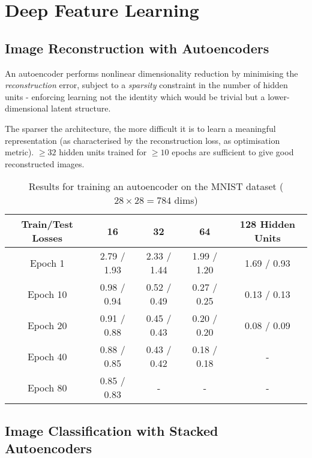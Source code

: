 \section{Deep Feature Learning}

\subsection{Image Reconstruction with Autoencoders}

An autoencoder performs nonlinear dimensionality reduction
by minimising the \textit{reconstruction} error,
subject to a \textit{sparsity} constraint in the number of hidden units -
enforcing learning not the identity which would be trivial but a lower-dimensional latent structure.

The sparser the architecture, the more difficult it is to learn a meaningful representation
(as characterised by the reconstruction loss, as optimisation metric).
$\geq 32$ hidden units trained for $\geq 10$ epochs are sufficient to give good reconstructed images.

\vspace{2.5pt}

\begin{table}[h]
\centering
\begin{tabular}{|c|c|c|c|c|}
\hline
Train/Test Losses & 16 & 32 & 64 & 128 Hidden Units \\
\hline
Epoch 1 & 2.79 / 1.93 & 2.33 / 1.44 & 1.99 / 1.20 & 1.69 / 0.93 \\
\hline
Epoch 10 & 0.98 / 0.94 & 0.52 / 0.49 & 0.27 / 0.25 & 0.13 / 0.13 \\
\hline
Epoch 20 & 0.91 / 0.88 & 0.45 / 0.43 & 0.20 / 0.20 & 0.08 / 0.09 \\
\hline
Epoch 40 & 0.88 / 0.85 & 0.43 / 0.42 & 0.18 / 0.18 & - \\
\hline
Epoch 80 & 0.85 / 0.83 & - & - & - \\
\hline
\end{tabular}
\caption{Results for training an autoencoder on the MNIST dataset ($28 \times 28 = 784$ dims)}
\label{tab:ae-results}
\end{table}

\vspace{-10pt}

\subsection{Image Classification with Stacked Autoencoders}

